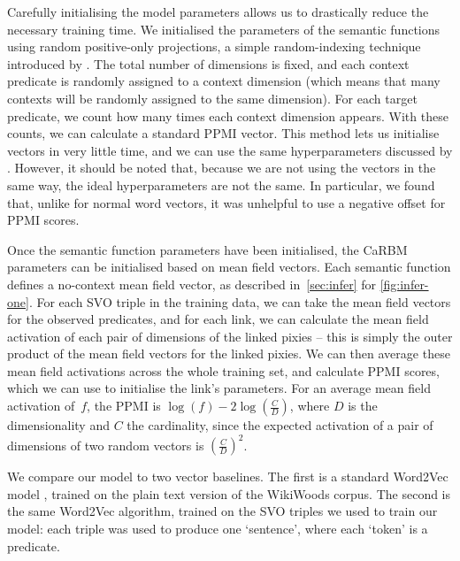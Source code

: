 \documentclass[a4paper,11pt]{article}
\begin{document}
Carefully initialising the model parameters allows us to drastically reduce the necessary training time.
We initialised the parameters of the semantic functions
using random positive-only projections,
a simple random-indexing technique introduced by \citet{qasemizadeh2016vector}.
The total number of dimensions is fixed,
and each context predicate is randomly assigned to a context dimension
(which means that many contexts will be randomly assigned to the same dimension).
For each target predicate,
we count how many times each context dimension appears.
With these counts, we can calculate a standard PPMI vector.
This method lets us initialise vectors in very little time,
and we can use the same hyperparameters discussed by \citet{levy2015hyperparam}.
However, it should be noted that,
because we are not using the vectors in the same way,
the ideal hyperparameters are not the same.
In particular, we found that, unlike for normal word vectors,
it was unhelpful to use a negative offset for PPMI scores.

Once the semantic function parameters have been initialised,
the CaRBM parameters can be initialised based on mean field vectors.
Each semantic function defines a no-context mean field vector,
as described in~\cref{sec:infer} for \cref{fig:infer-one}.
For each SVO triple in the training data,
we can take the mean field vectors for the observed predicates,
and for each link, we can calculate
the mean field activation of each pair of dimensions of the linked pixies --
this is simply the outer product of the mean field vectors for the linked pixies.
We can then average these mean field activations across the whole training set,
and calculate PPMI scores,
which we can use to initialise the link's parameters.
For an average mean field activation of~$f$,
the PPMI is ${\log(f)-2\log(\frac{C}{D})}$,
where $D$ is the dimensionality and $C$ the cardinality,
since the expected activation of a pair of dimensions of two random vectors is $(\frac{C}{D})^2$.

We compare our model to two vector baselines.
The first is a standard Word2Vec model \citep{mikolov2013vector},
trained on the plain text version of the WikiWoods corpus.
The second is the same Word2Vec algorithm,
trained on the SVO triples we used to train our model:
each triple was used to produce one `sentence',
where each `token' is a predicate.
\end{document}
